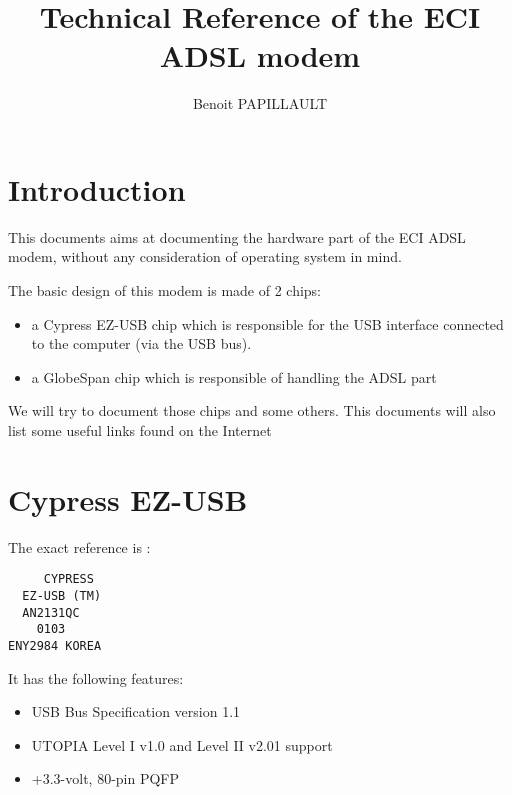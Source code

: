 \documentclass[a4paper,12pt]{article}
\title{\huge{Technical Reference of the ECI ADSL modem}}
\author{Benoit PAPILLAULT}
\begin{document}
\maketitle
\newpage
\tableofcontents
\newpage

\section{Introduction}

This documents aims at documenting the hardware part of the ECI ADSL
modem, without any consideration of operating system in mind.

The basic design of this modem is made of 2 chips:
\begin{itemize}
\item a Cypress EZ-USB chip which is responsible for the USB interface
connected to the computer (via the USB bus).
\item a GlobeSpan chip which is responsible of handling the ADSL part
\end{itemize}

We will try to document those chips and some others. This documents
will also list some useful links found on the Internet

\section{Cypress EZ-USB}

The exact reference is :
\begin{verbatim}
     CYPRESS
  EZ-USB (TM)
  AN2131QC
    0103
ENY2984 KOREA
\end{verbatim}

It has the following features:
\begin{itemize}
\item USB Bus Specification version 1.1
\item UTOPIA Level I v1.0 and Level II v2.01 support
\item +3.3-volt, 80-pin PQFP
\end{itemize}
\end{document}
